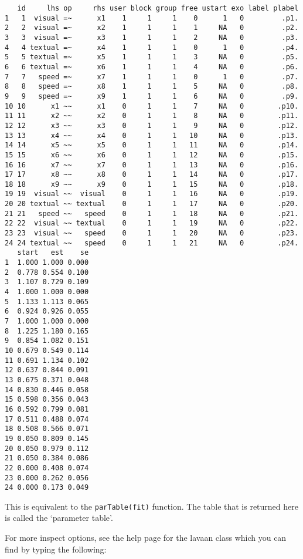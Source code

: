 \begin{verbatim}
   id     lhs op     rhs user block group free ustart exo label plabel
1   1  visual =~      x1    1     1     1    0      1   0         .p1.
2   2  visual =~      x2    1     1     1    1     NA   0         .p2.
3   3  visual =~      x3    1     1     1    2     NA   0         .p3.
4   4 textual =~      x4    1     1     1    0      1   0         .p4.
5   5 textual =~      x5    1     1     1    3     NA   0         .p5.
6   6 textual =~      x6    1     1     1    4     NA   0         .p6.
7   7   speed =~      x7    1     1     1    0      1   0         .p7.
8   8   speed =~      x8    1     1     1    5     NA   0         .p8.
9   9   speed =~      x9    1     1     1    6     NA   0         .p9.
10 10      x1 ~~      x1    0     1     1    7     NA   0        .p10.
11 11      x2 ~~      x2    0     1     1    8     NA   0        .p11.
12 12      x3 ~~      x3    0     1     1    9     NA   0        .p12.
13 13      x4 ~~      x4    0     1     1   10     NA   0        .p13.
14 14      x5 ~~      x5    0     1     1   11     NA   0        .p14.
15 15      x6 ~~      x6    0     1     1   12     NA   0        .p15.
16 16      x7 ~~      x7    0     1     1   13     NA   0        .p16.
17 17      x8 ~~      x8    0     1     1   14     NA   0        .p17.
18 18      x9 ~~      x9    0     1     1   15     NA   0        .p18.
19 19  visual ~~  visual    0     1     1   16     NA   0        .p19.
20 20 textual ~~ textual    0     1     1   17     NA   0        .p20.
21 21   speed ~~   speed    0     1     1   18     NA   0        .p21.
22 22  visual ~~ textual    0     1     1   19     NA   0        .p22.
23 23  visual ~~   speed    0     1     1   20     NA   0        .p23.
24 24 textual ~~   speed    0     1     1   21     NA   0        .p24.
   start   est    se
1  1.000 1.000 0.000
2  0.778 0.554 0.100
3  1.107 0.729 0.109
4  1.000 1.000 0.000
5  1.133 1.113 0.065
6  0.924 0.926 0.055
7  1.000 1.000 0.000
8  1.225 1.180 0.165
9  0.854 1.082 0.151
10 0.679 0.549 0.114
11 0.691 1.134 0.102
12 0.637 0.844 0.091
13 0.675 0.371 0.048
14 0.830 0.446 0.058
15 0.598 0.356 0.043
16 0.592 0.799 0.081
17 0.511 0.488 0.074
18 0.508 0.566 0.071
19 0.050 0.809 0.145
20 0.050 0.979 0.112
21 0.050 0.384 0.086
22 0.000 0.408 0.074
23 0.000 0.262 0.056
24 0.000 0.173 0.049
\end{verbatim}

This is equivalent to the \texttt{parTable(fit)} function. The table
that is returned here is called the `parameter table'.

For more inspect options, see the help page for the lavaan class which
you can find by typing the following:

\begin{Shaded}
\begin{Highlighting}[]
\end{Highlighting}
\end{Shaded}

